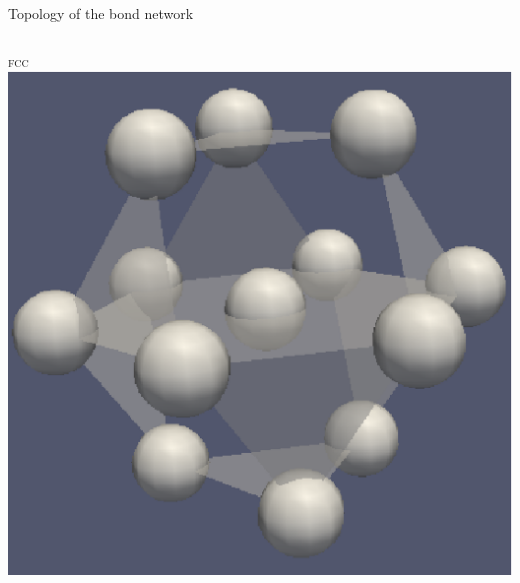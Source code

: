\begin{frame}{Topology of the bond network}
	\begin{columns}
	\centering \textsc{fcc}\\
	\includegraphics[width=\columnwidth]{fcc_13}
	

\end{columns}
\end{frame}
